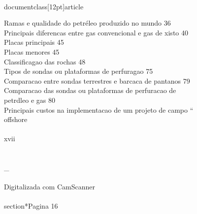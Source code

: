 \\documentclass[12pt]{article}
\begin{document}
Ramas e qualidade do petréleo produzido no mundo 36\\
Principais diferencas entre gas convencional e gas de xisto 40\\
Placas principais 45\\
Placas menores 45\\
Classificagao das rochas 48\\
Tipos de sondas ou plataformas de perfuragao 75\\
Comparacao entre sondas terrestres e barcaca de pantanos 79\\
Comparacao das sondas ou plataformas de perfuracao de\\
petrdleo e gas 80\\
Principais custos na implementacao de um projeto de campo “\\
offshore\\
\\
xvii\\
\\
\\_\\
\\
Digitalizada com CamScanner\\

\\section*{Pagina 16}
\end{document}

